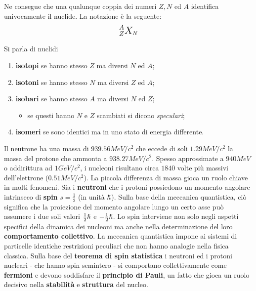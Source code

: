 Ne consegue che una qualunque coppia dei numeri $Z, N$ ed $A$ identifica univocamente il nuclide.
La notazione è la seguente:
\[
\mathlarger{\mathlarger{^A _{Z} X}}_N
\]

Si parla di nuclidi

\begin{enumerate}
    \item \textbf{isotopi} se hanno stesso $Z$ ma diversi $N$ ed $A$;
    \item  \textbf{isotoni} se hanno stesso $N$ ma diversi $Z$ ed $A$;
    \item \textbf{isobari} se hanno stesso $A$ ma diversi $N$ ed $Z$;
    \begin{itemize}
        \item  se questi hanno $N$ e $Z$ scambiati si dicono \emph{speculari};
    \end{itemize}
    \item \textbf{isomeri} se sono identici ma in uno stato di energia differente.
\end{enumerate}

Il neutrone ha una massa di $939.56 MeV/c^2$ che eccede di soli $1.29 MeV / c^2$ la massa del protone che ammonta a
$938.27 MeV/c^2$.
Spesso approssimate a $940 MeV$ o addirittura ad $1 GeV/c^2$, i nucleoni risultano circa $1840$ volte più massivi dell'elettrone ($0.51 MeV/c^2$).
La piccola differenza di massa gioca un ruolo chiave in molti fenomeni.
Sia i \textbf{neutroni} che i protoni possiedono un momento angolare intrinseco di \textbf{spin} $s=\frac{1}{2}$ (in unità $\hslash$).
Sulla base della meccanica quantistica, ciò significa che la proiezione del momento angolare lungo un certo asse può assumere i due soli valori $\frac{1}{2} \hslash$ e $-\frac{1}{2}\hslash$.
Lo spin interviene non solo negli aspetti specifici della dinamica dei nucleoni ma anche nella determinazione del loro \textbf{comportamento collettivo}.
La meccanica quantistica impone ai sistemi di particelle identiche restrizioni peculiari che non hanno analogie nella fisica classica.
Sulla base del \textbf{teorema di spin statistica} i neutroni ed i protoni nucleari - che hanno spin semintero -
si comportano collettivamente come \textbf{fermioni} e devono soddisfare il \textbf{principio di Pauli}, un fatto che
gioca un ruolo decisivo nella \textbf{stabilità} e \textbf{struttura} del nucleo.



